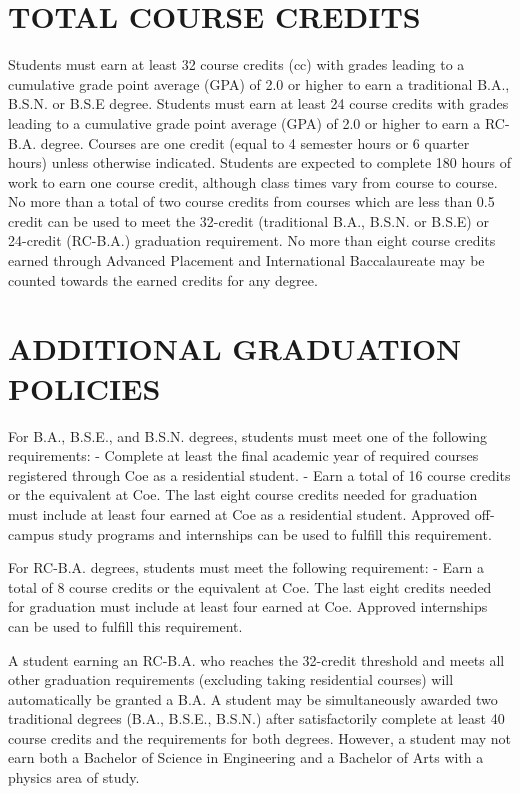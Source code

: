 \documentclass[
  letterpaper,
]{scrbook}
\begin{document}
\section{TOTAL COURSE CREDITS}\label{total-course-credits}

Students must earn at least 32 course credits (cc) with grades leading
to a cumulative grade point average (GPA) of 2.0 or higher to earn a
traditional B.A., B.S.N. or B.S.E degree. Students must earn at least 24
course credits with grades leading to a cumulative grade point average
(GPA) of 2.0 or higher to earn a RC-B.A. degree. Courses are one credit
(equal to 4 semester hours or 6 quarter hours) unless otherwise
indicated. Students are expected to complete 180 hours of work to earn
one course credit, although class times vary from course to course. No
more than a total of two course credits from courses which are less than
0.5 credit can be used to meet the 32-credit (traditional B.A., B.S.N.
or B.S.E) or 24-credit (RC-B.A.) graduation requirement. No more than
eight course credits earned through Advanced Placement and International
Baccalaureate may be counted towards the earned credits for any degree.

\section{ADDITIONAL GRADUATION
POLICIES}\label{additional-graduation-policies}

For B.A., B.S.E., and B.S.N. degrees, students must meet one of the
following requirements: - Complete at least the final academic year of
required courses registered through Coe as a residential student. - Earn
a total of 16 course credits or the equivalent at Coe. The last eight
course credits needed for graduation must include at least four earned
at Coe as a residential student. Approved off-campus study programs and
internships can be used to fulfill this requirement.

For RC-B.A. degrees, students must meet the following requirement: -
Earn a total of 8 course credits or the equivalent at Coe. The last
eight credits needed for graduation must include at least four earned at
Coe. Approved internships can be used to fulfill this requirement.

A student earning an RC-B.A. who reaches the 32-credit threshold and
meets all other graduation requirements (excluding taking residential
courses) will automatically be granted a B.A. A student may be
simultaneously awarded two traditional degrees (B.A., B.S.E., B.S.N.)
after satisfactorily complete at least 40 course credits and the
requirements for both degrees. However, a student may not earn both a
Bachelor of Science in Engineering and a Bachelor of Arts with a physics
area of study.
\end{document}
